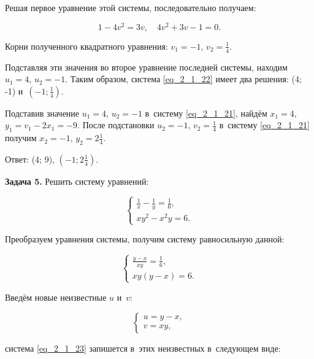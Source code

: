 Решая первое уравнение этой системы, последовательно получаем:

\begin{equation*}
1 - 4v^{2} = 3v, \quad
4v^{2} + 3v - 1 = 0.
\end{equation*}

Корни полученного квадратного уравнения:
$v_{1} = -1$, $\displaystyle v_{2} = \frac{1}{4}$.

Подставляя эти значения во второе уравнение последней системы, находим
$u_{1} = 4$, $u_{2} = -1$.
Таким образом, система \eqref{eq_2_1_22} имеет два решения:
(4; -1) и~$\left(-1; \displaystyle \frac{1}{4}\right)$.

Подставив значение $u_{1} = 4$, $u_{2} = -1$ в~систему \eqref{eq_2_1_21},
найдём $x_{1} = 4$, $y_{1} = v_{1} - 2x_{1} = -9$.
После подстановки $u_{2} = -1$, $\displaystyle v_{2} = \frac{1}{4}$
в~систему \eqref{eq_2_1_21} получим
$x_{2} = -1$, $\displaystyle y_{2} = 2\frac{1}{4}$.

Ответ: (4; 9), $\left(-1; \displaystyle 2\frac{1}{4}\right)$.

\textbf{Задача 5.} Решить систему уравнений:

\begin{equation*}
\begin{cases}
\displaystyle \frac{1}{x} - \frac{1}{y} = \frac{1}{6}, \\[10pt]
xy^{2} - x^{2}y = 6.
\end{cases}
\end{equation*}

Преобразуем уравнения системы, получим систему равносильную данной:

\begin{equation}\label{eq_2_1_23}
\begin{cases}
\displaystyle \frac{y - x}{xy} = \frac{1}{6}, \\[10pt]
xy(y - x) = 6.
\end{cases}
\end{equation}

Введём новые неизвестные $u$ и~$v$:

\begin{equation}\label{eq_2_1_24}
\begin{cases}
u = y - x, \\
v = xy,
\end{cases}
\end{equation}

система \eqref{eq_2_1_23} запишется в~этих неизвестных в~следующем виде:

